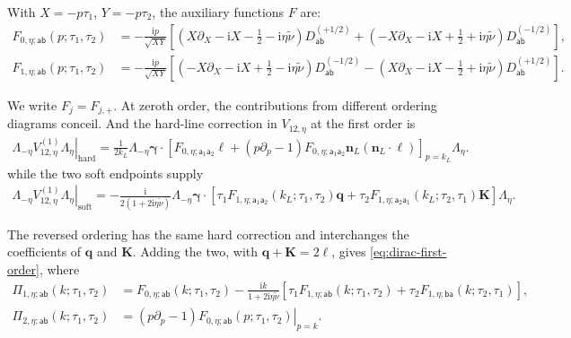 \documentclass[a4paper,12pt]{article}
\def\mb{\mathbf}
\def\ii{\mathrm{i}}
\def\tn{\tilde\nu}
\def\aa{\mathsf{a}}
\def\bb{\mathsf{b}}
\begin{document}
With $X=-p\tau_1$, $Y=-p\tau_2$, the auxiliary functions $F$ are:
\begin{align}
 F_{0,\eta;\aa\bb}(p;\tau_1,\tau_2)
 &=-\frac{\ii p}{\sqrt{XY}}\left[
 (X\partial_X-\ii X-\tfrac12-\ii\eta\tn)D^{(+1/2)}_{\aa\bb}
 +(-X\partial_X-\ii X+\tfrac12+\ii\eta\tn)D^{(-1/2)}_{\aa\bb}
 \right],\nonumber\\
 F_{1,\eta;\aa\bb}(p;\tau_1,\tau_2)
 &=-\frac{\ii p}{\sqrt{XY}}\left[
 (-X\partial_X-\ii X+\tfrac12-\ii\eta\tn)D^{(-1/2)}_{\aa\bb}
 -(X\partial_X-\ii X-\tfrac12+\ii\eta\tn)D^{(+1/2)}_{\aa\bb}
 \right].
 \label{eq:dirac-hard-kernels}
\end{align}

We write $F_j=F_{j,+}$.
At zeroth order, the contributions from different ordering diagrams conceil.
And the hard-line correction in $V_{12,\eta}$ at the first order is
\begin{align}
 \left.\Lambda_{-\eta}V_{12,\eta}^{(1)}\Lambda_\eta\right|_{\mathrm{hard}}
 =\frac1{2k_L}\Lambda_{-\eta}\bm\gamma\cdot
 \left[F_{0,\eta;\aa_1\aa_2}\bm\ell
 +(p\partial_p-1)F_{0,\eta;\aa_1\aa_2}
       \mb n_L(\mb n_L\cdot\bm\ell)\right]_{p=k_L}\Lambda_\eta.
 \label{eq:dirac-hard-expansion}
\end{align}
while the two soft endpoints supply
\begin{align}
 \left.\Lambda_{-\eta}V_{12,\eta}^{(1)}\Lambda_\eta\right|_{\mathrm{soft}}
 =-\frac{\ii}{2(1+2\ii\eta\tn)}\Lambda_{-\eta}\bm\gamma\cdot
 \left[\tau_1F_{1,\eta;\aa_1\aa_2}(k_L;\tau_1,\tau_2)\mb q
 +\tau_2F_{1,\eta;\aa_2\aa_1}(k_L;\tau_2,\tau_1)\mb K\right]\Lambda_\eta.
 \label{eq:dirac-endpoint-correction}
\end{align}

The reversed ordering has the same hard correction and interchanges the coefficients of $\mb q$ and $\mb K$.
Adding the two, with $\mb q+\mb K=2\bm\ell$, gives \eqref{eq:dirac-first-order}, where
\begin{align}
 \Pi_{1,\eta;\aa\bb}(k;\tau_1,\tau_2)
 &=F_{0,\eta;\aa\bb}(k;\tau_1,\tau_2)
 -\frac{\ii k}{1+2\ii\eta\tn}
 [\tau_1F_{1,\eta;\aa\bb}(k;\tau_1,\tau_2)
  +\tau_2F_{1,\eta;\bb\aa}(k;\tau_2,\tau_1)],\nonumber\\
 \Pi_{2,\eta;\aa\bb}(k;\tau_1,\tau_2)
 &=\left.(p\partial_p-1)F_{0,\eta;\aa\bb}(p;\tau_1,\tau_2)\right|_{p=k}.
 \label{eq:dirac-Pi}
\end{align}
\end{document}
